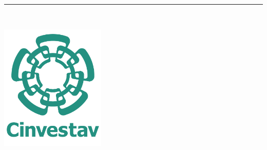 %
\begin{titlepage}
	\flushright
	\hfill
	\vfill
	{\LARGE\thesisTitle \par}
	\rule[5pt]{\textwidth}{.4pt} \par
	{\Large\thesisName}
	\vfill
	\textit{\large\thesisDate} \\
\end{titlepage}


\begin{titlepage}
	\tgherosfont
	\centering

	\includegraphics[width=5cm]{gfx/logospng1.png} \\[2mm]
	{\LARGE \thesisUniversity} \\[2mm]


\end{titlepage}
